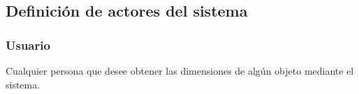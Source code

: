 \subsection{Definición de actores del sistema}
\subsubsection{Usuario}
Cualquier persona que desee obtener las dimensiones de algún objeto mediante el sistema.